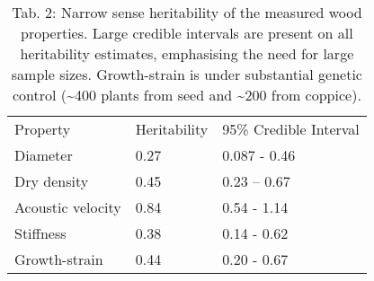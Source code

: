 
\begin{table}
\centering
\caption{Tab. 2: Narrow sense heritability of the measured wood properties. Large credible intervals are present on all heritability estimates, emphasising the need for large sample sizes. Growth-strain is under substantial genetic control (\sim400 plants from seed and \sim200 from coppice).}
\begin{tabular}{lll}
Property          & Heritability & 95\% Credible Interval \\
Diameter          & 0.27         & 0.087 - 0.46           \\
Dry density       & 0.45         & 0.23 – 0.67            \\
Acoustic velocity & 0.84         & 0.54 - 1.14            \\
Stiffness         & 0.38         & 0.14 - 0.62            \\
Growth-strain     & 0.44         & 0.20 - 0.67           
\end{tabular}
\end{table}